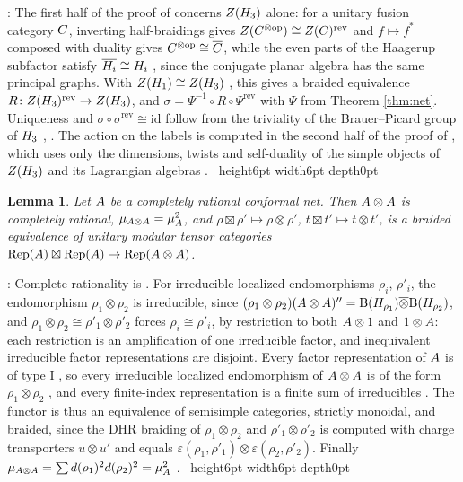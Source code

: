 \documentclass[leqno]{article}
\newcommand{\B}{\mathrm{B}}
\let\cal\relax
\newcommand{\cal}{\mathcal}
\newcommand{\qed}{\hfill \vrule height6pt  width6pt depth0pt}
\newcommand{\co}{\colon}
\newcommand{\ot}{\otimes}
\newcommand{\ovl}{\overline}
\newcommand{\otvn}{\ovl\ot}
\newcommand{\epsi}{\varepsilon}
\DeclareMathOperator{\Rep}{Rep}
\newtheorem{lemma}[thm]{Lemma}
\newenvironment{proof}[1][]{\noindent {\it Proof #1} : }{\hbox{~}\qed
\smallskip
}
\numberwithin{equation}{section}
\begin{document}
\begin{proof}
The first half of the proof of \cite[Proposition 7.12(1)]{ArhII} concerns $Z(\cal H_3)$ alone: for a unitary fusion category $\cal C$, inverting half-braidings gives $Z(\cal C^{\ot\mathrm{op}}) \cong Z(\cal C)^{\mathrm{rev}}$ and $f \mapsto f^*$ composed with duality gives $\cal C^{\ot\mathrm{op}} \cong \ovl{\cal C}$, while the even parts of the Haagerup subfactor satisfy $\ovl{\cal H_i} \cong \cal H_i$ \cite[Theorem 4.1 p.~21]{JMS14}, since the conjugate planar algebra has the same principal graphs. With $Z(\cal H_1) \cong Z(\cal H_3)$ \cite[Theorem 3.1 p.~9]{ENO11}, this gives a braided equivalence $R \co Z(\cal H_3)^{\mathrm{rev}} \to Z(\cal H_3)$, and $\sigma = \Psi^{-1} \circ R \circ \Psi^{\mathrm{rev}}$ with $\Psi$ from Theorem \ref{thm:net}. Uniqueness and $\sigma \circ \sigma^{\mathrm{rev}} \cong \mathrm{id}$ follow from the triviality of the Brauer--Picard group of $\cal H_3$ \cite[Theorem 1.5 p.~5]{GrS12}, \cite[Theorem 1.1 p.~3]{ENO10}. The action on the labels is computed in the second half of the proof of \cite[Proposition 7.12(1)]{ArhII}, which uses only the dimensions, twists and self-duality of the simple objects of $Z(\cal H_3)$ and its Lagrangian algebras \cite[Proposition 3.3]{ArhII}.
\end{proof}



\begin{lemma}
\label{lem:tensor-nets}
Let $\cal A$ be a completely rational conformal net. Then $\cal A \ot \cal A$ is completely rational, $\mu_{\cal A \ot \cal A} = \mu_{\cal A}^2$, and $\rho \boxtimes \rho' \mapsto \rho \ot \rho'$, $t \boxtimes t' \mapsto t \ot t'$, is a braided equivalence of unitary modular tensor categories $\Rep(\cal A) \boxtimes \Rep(\cal A) \to \Rep(\cal A \ot \cal A)$.
\end{lemma}

\begin{proof}
Complete rationality is \cite[Lemma 25 p.~21]{Lon03}. For irreducible localized endomorphisms $\rho_i$, $\rho'_i$, the endomorphism $\rho_1 \ot \rho_2$ is irreducible, since $(\rho_1 \ot \rho_2)(\cal A \ot \cal A)'' = \B(\cal H_{\rho_1}) \otvn \B(\cal H_{\rho_2})$, and $\rho_1 \ot \rho_2 \cong \rho'_1 \ot \rho'_2$ forces $\rho_i \cong \rho'_i$, by restriction to both $\cal A\ot 1$ and $1\ot\cal A$: each restriction is an amplification of one irreducible factor, and inequivalent irreducible factor representations are disjoint. Every factor representation of $\cal A$ is of type I \cite[Corollary 14 p.~14]{KLM01}, so every irreducible localized endomorphism of $\cal A \ot \cal A$ is of the form $\rho_1 \ot \rho_2$ \cite[Lemma 27 p.~22]{KLM01}, and every finite-index representation is a finite sum of irreducibles \cite[Corollary 39 p.~27]{KLM01}. The functor is thus an equivalence of semisimple categories, strictly monoidal, and braided, since the DHR braiding of $\rho_1 \ot \rho_2$ and $\rho'_1 \ot \rho'_2$ is computed with charge transporters $u \ot u'$ and equals $\epsi(\rho_1,\rho'_1) \ot \epsi(\rho_2,\rho'_2)$. Finally $\mu_{\cal A \ot \cal A} = \sum d(\rho_1)^2d(\rho_2)^2 = \mu_{\cal A}^2$ \cite[Theorem 33 p.~24]{KLM01}.
\end{proof}
\end{document}
